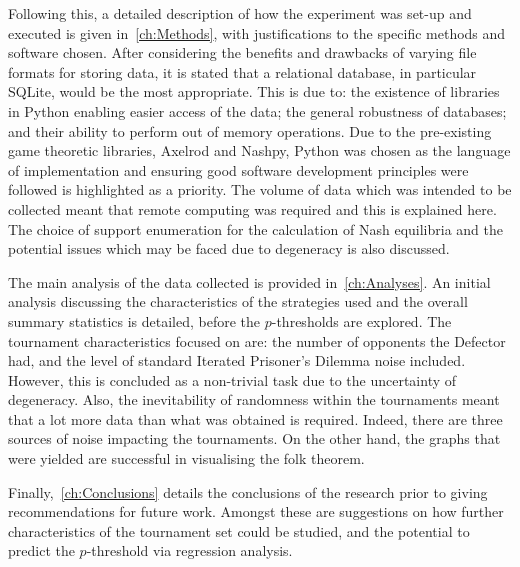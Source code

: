 Following this, a detailed description of how the experiment was set-up and
executed is given in~\autoref{ch:Methods}, with justifications to the specific methods and software
chosen. After considering the benefits and drawbacks of varying file formats for
storing data, it is stated that a relational database, in particular SQLite,
would be the most appropriate. This is due to: the existence of libraries in
Python enabling easier access of the data; the general robustness of
databases; and their ability to perform out of memory operations. Due to the
pre-existing game theoretic libraries, Axelrod and Nashpy, Python was chosen as
the language of implementation and ensuring good software development principles
were followed is highlighted as a priority. The volume of data which was intended
to be collected meant that remote computing was required and this is explained here. The choice of support enumeration for the calculation of
Nash equilibria and the potential issues which may be faced due to degeneracy is
also discussed.

The main analysis of the data collected is provided in~\autoref{ch:Analyses}. An initial analysis discussing the characteristics of
the strategies used and the overall summary statistics is detailed, before the
\(p\)-thresholds are explored. The tournament characteristics focused on
are: the number of opponents the Defector had, and the level of standard
Iterated Prisoner's Dilemma noise
included. However, this is concluded as a non-trivial task due to the
uncertainty of degeneracy.
Also, the inevitability of randomness within the tournaments meant that a lot
more data than what was obtained is required. Indeed, there are three sources of
noise impacting the tournaments. On the other hand, the graphs that
were yielded are successful in visualising the folk theorem.

Finally,~\autoref{ch:Conclusions} details the
conclusions of the research prior to giving recommendations for future work.
Amongst these are suggestions on how further characteristics of the tournament
set could be studied, and the potential to predict the \(p\)-threshold via regression analysis.